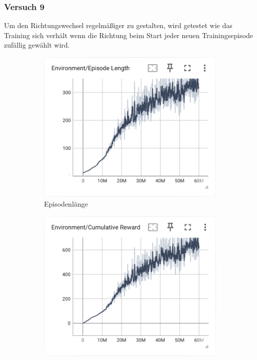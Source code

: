 \subsubsection{Versuch 9}
Um den Richtungswechsel regelmäßiger zu gestalten, wird getestet wie das Training sich verhält wenn die Richtung beim Start jeder neuen Trainingsepisode zufällig gewählt wird.

\begin{figure}[H]
  \centering  
  \begin{subfigure}{.49\textwidth}
      \centering  
      \includegraphics[width=\textwidth]{img/135_episode_length}
      \caption{Episodenlänge}
      \label{fig:135_episode_length}
    \end{subfigure}
    \begin{subfigure}{.49\textwidth}
      \centering  
      \includegraphics[width=\textwidth]{img/135_cumulative_reward}

\end{subfigure}
\end{figure}
